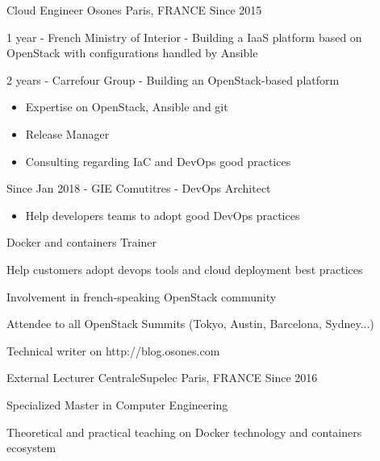 

\begin{cventries}

  \cventry
    {Cloud Engineer} %
    {Osones} %
    {Paris, FRANCE} %
    {Since 2015} %
    {
      \begin{cvitems} %
        \item {1 year - French Ministry of Interior - Building a IaaS
          platform based on OpenStack with configurations handled by Ansible}
        \item {2 years - Carrefour Group - Building an OpenStack-based platform}
          \begin{itemize}
            \item {Expertise on OpenStack, Ansible and git}
            \item {Release Manager}
            \item {Consulting regarding IaC and DevOps good practices}
          \end{itemize}
        \item {Since Jan 2018 - GIE Comutitres - DevOps Architect}
          \begin{itemize}
            \item {Help developers teams to adopt good DevOps practices}
          \end{itemize}
      \item {Docker and containers Trainer}
      \item {Help customers adopt devops tools and cloud deployment best
        practices}
      \item {Involvement in french-speaking OpenStack community}
      \item {Attendee to all OpenStack Summits (Tokyo, Austin, Barcelona, Sydney...)}
      \item {Technical writer on http://blog.osones.com}
      \end{cvitems}
    }

  \cventry
    {External Lecturer} %
    {CentraleSupelec}
    {Paris, FRANCE} %
    {Since 2016} %
    {
      \begin{cvitems} %
        \item {Specialized Master in Computer Engineering}
        \item {Theoretical and practical teaching on Docker technology and
          containers ecosystem}
      \end{cvitems}
    }


\end{cventries}
